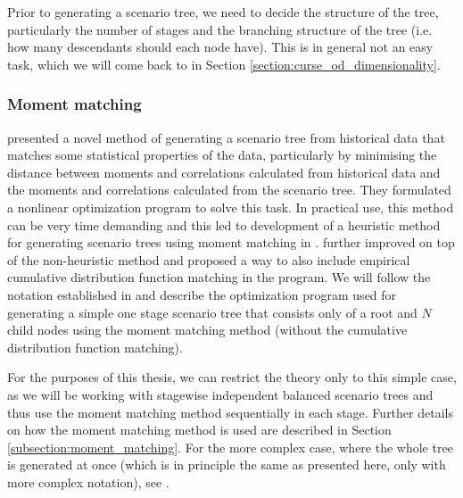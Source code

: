 Prior to generating a scenario tree, we need to decide the structure of the tree, particularly the number of stages and the branching structure of the tree (i.e. how many descendants should each node have). This is in general not an easy task, which we will come back to in Section \ref{section:curse_od_dimensionality}.
\subsubsection{Moment matching}
\cite{hoyland_wallace_moment_matching} presented a novel method of generating a scenario tree from historical data that matches some statistical properties of the data, particularly by minimising the distance between moments and correlations calculated from historical data and the moments and correlations calculated from the scenario tree. They formulated a nonlinear optimization program to solve this task. In practical use, this method can be very time demanding and this led to development of a heuristic method for generating scenario trees using moment matching in \cite{hoyland_wallace_moment_matching_heuristic}.  \cite{moment_matching_agarwal} further improved on top of the non-heuristic method and proposed a way to also include empirical cumulative distribution function matching in the program. We will follow the notation established in \cite{moment_matching_agarwal} and describe the optimization program used for generating a simple one stage scenario tree that consists only of a root and $N$ child nodes using the moment matching method (without the cumulative distribution function matching).
\begin{rem}
For the purposes of this thesis, we can restrict the theory only to this simple case, as we will be working with stagewise independent balanced scenario trees and thus use the moment matching method sequentially in each stage. Further details on how the moment matching method is used are described in Section \ref{subsection:moment_matching}. For the more complex case, where the whole tree is generated at once (which is in principle the same as presented here, only with more complex notation), see \cite{hoyland_wallace_moment_matching}.
\end{rem}
